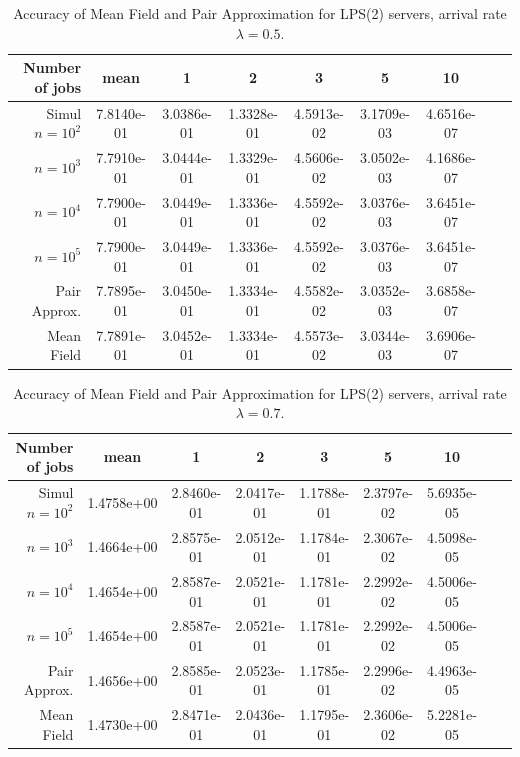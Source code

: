 \documentclass[acmsmall,nonacm]{acmart}
\begin{document}
\begin{table}[ht]
    \centering
    \begin{tabular}{|r|c|c|c|c|c|c|c|c|}
    \hline 
        Number of jobs & mean & 1 & 2 & 3 & 5 & 10\\ \hline
         \hline
Simul $n=10^2$&         7.8140e-01 &  3.0386e-01  & 1.3328e-01 &  4.5913e-02   &3.1709e-03  & 4.6516e-07\\
  $n=10^3$ & 7.7910e-01&   3.0444e-01 &  1.3329e-01&   4.5606e-02 &  3.0502e-03&   4.1686e-07\\
  $n=10^4$ & 7.7900e-01&   3.0449e-01 &  1.3336e-01&   4.5592e-02 &  3.0376e-03&   3.6451e-07\\
  $n=10^5$ & 7.7900e-01&   3.0449e-01 &  1.3336e-01&   4.5592e-02 &  3.0376e-03&   3.6451e-07\\\hline
 Pair Approx.  &7.7895e-01&   3.0450e-01 &  1.3334e-01&   4.5582e-02 &  3.0352e-03&   3.6858e-07\\\hline
 Mean Field & 7.7891e-01&   3.0452e-01 &  1.3334e-01&   4.5573e-02 &  3.0344e-03&   3.6906e-07\\
         \hline
    \end{tabular}
    \caption{Accuracy of Mean Field and Pair Approximation for LPS(2) servers, arrival rate $\lambda=0.5$. }
    \label{tab:simulPAIR05LPS_K2}
\end{table}

\begin{table}[ht]
    \centering
    \begin{tabular}{|r|c|c|c|c|c|c|c|c|}
    \hline 
        Number of jobs & mean & 1 & 2 & 3 & 5 & 10\\ \hline
         \hline
Simul $n=10^2$ &1.4758e+00  & 2.8460e-01  & 2.0417e-01  & 1.1788e-01  & 2.3797e-02 &  5.6935e-05\\
  $n=10^3$ & 1.4664e+00 &  2.8575e-01&   2.0512e-01&   1.1784e-01&   2.3067e-02  & 4.5098e-05\\
 $n=10^4$ &  1.4654e+00 &  2.8587e-01&   2.0521e-01&   1.1781e-01&   2.2992e-02  & 4.5006e-05\\
  $n=10^5$ & 1.4654e+00 &  2.8587e-01&   2.0521e-01&   1.1781e-01&   2.2992e-02  & 4.5006e-05\\\hline
 Pair Approx. &  1.4656e+00 &  2.8585e-01&   2.0523e-01&   1.1785e-01&   2.2996e-02  & 4.4963e-05\\\hline
  Mean Field &  1.4730e+00 &  2.8471e-01&   2.0436e-01&   1.1795e-01&   2.3606e-02  & 5.2281e-05\\
         \hline
    \end{tabular}
    \caption{Accuracy of Mean Field and Pair Approximation for LPS(2) servers, arrival rate $\lambda=0.7$. }
    \label{tab:simulPAIR07LPS_K2}
\end{table}
\end{document}
